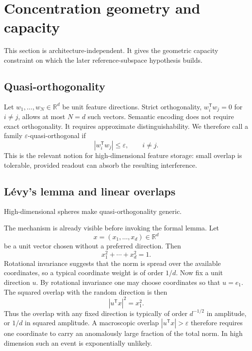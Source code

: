\documentclass[
  aps,
  reprint,
  superscriptaddress,
  floatfix,
  nofootinbib,
  longbibliography
]{revtex4-2}
\newcommand{\R}{\mathbb{R}}
\newcommand{\T}{^{\mathsf{T}}}
\begin{document}
\section{Concentration geometry and capacity}
\label{sec:concentration}

This section is architecture-independent. It gives the geometric
capacity constraint on which the later reference-subspace hypothesis builds.

\subsection{Quasi-orthogonality}
\label{sec:quasiortho}

Let $w_{1},\dots,w_{N}\in\R^{d}$ be unit feature directions. Strict orthogonality,
$w_i\T w_j=0$ for $i\neq j$, allows at most $N=d$ such vectors. Semantic
encoding does not require exact orthogonality. It requires approximate
distinguishability. We therefore call a family
$\varepsilon$-quasi-orthogonal if
%
\begin{equation}
\label{eq:quasiortho}
|w_i\T w_j|\le \varepsilon,\qquad i\neq j .
\end{equation}
%
This is the relevant notion for high-dimensional feature storage:
small overlap is tolerable, provided readout can absorb the resulting
interference.

\subsection{L\'evy's lemma and linear overlaps}
\label{sec:levy}

High-dimensional spheres make quasi-orthogonality generic.

The mechanism is already visible before invoking the formal lemma.  Let
\[
        x=(x_1,\ldots,x_d)\in\R^d
\]
be a unit vector chosen without a preferred direction.  Then
\[
        x_1^2+\cdots+x_d^2=1 .
\]
Rotational invariance suggests that the norm is spread over the available
coordinates, so a typical coordinate weight is of order $1/d$.  Now fix a
unit direction $u$.  By rotational invariance one may choose coordinates so
that $u=e_1$.  The squared overlap with the random direction is then
\[
        |u\T x|^2=x_1^2 .
\]
Thus the overlap with any fixed direction is typically of order $d^{-1/2}$
in amplitude, or $1/d$ in squared amplitude.  A macroscopic overlap
$|u\T x|>\varepsilon$ therefore requires one coordinate to carry an
anomalously large fraction of the total norm.  In high dimension such an
event is exponentially unlikely.
\end{document}
